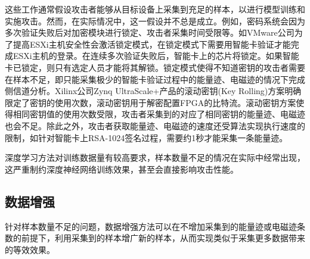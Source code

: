 {	这些工作通常假设攻击者能够从目标设备上采集到充足的样本，以进行模型训练和实施攻击。然而，在实际情况中，这一假设并不总是成立。例如，密码系统会因为多次验证失败后对加密模块进行锁定、攻击者采集时间受限等。如VMware公司为了提高ESXi主机安全性会激活锁定模式，在锁定模式下需要用智能卡验证才能完成ESXi主机的登录。在连续多次验证失败后，智能卡上的芯片将锁定。如果智能卡已锁定，则只有选定人员才能将其解锁\citep{GUID-04636353-4A11-4874-9D59-7F4F4E5CF1F}。锁定模式使得不知道密钥的攻击者需要在样本不足，即只能采集极少的智能卡验证过程中的能量迹、电磁迹的情况下完成侧信道分析。Xilinx公司Zynq UltraScale+产品的滚动密钥(Key Rolling)方案明确限定了密钥的使用次数\citep{UG1085}，滚动密钥用于解密配置FPGA的比特流。滚动密钥方案使得相同密钥值的使用次数受限，攻击者采集到的对应了相同密钥的能量迹、电磁迹也会不足。除此之外，攻击者获取能量迹、电磁迹的速度还受算法实现执行速度的限制，如针对智能卡上RSA-1024签名过程，需要约1秒才能采集一条能量迹。
	
	深度学习方法对训练数据量有较高要求，样本数量不足的情况在实际中经常出现，这严重制约深度神经网络训练效果，甚至会直接影响攻击性能。
	\subsection{数据增强}
	针对样本数量不足的问题，数据增强方法可以在不增加采集到的能量迹或电磁迹条数的前提下，利用采集到的样本增广新的样本，从而实现类似于采集更多数据带来的等效效果。
	
}

